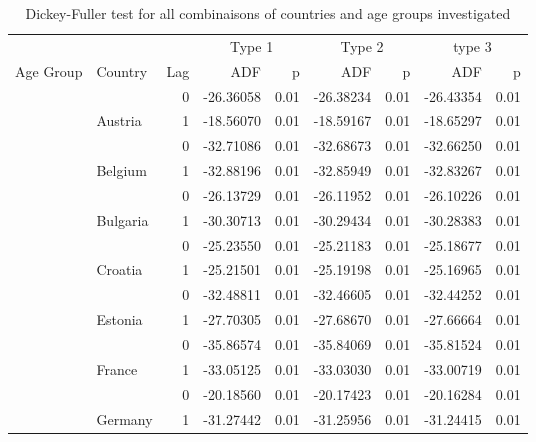 \documentclass[
]{article}
\begin{document}
\begin{table}
\centering
\caption{\label{tab:unnamed-chunk-6}Dickey-Fuller test for all combinaisons of countries and age groups investigated}
\centering
\begin{tabular}[t]{l|l|r|r|r|r|r|r|r}
\hline
\multicolumn{3}{c|}{ } & \multicolumn{2}{c|}{Type 1} & \multicolumn{2}{c|}{Type 2} & \multicolumn{2}{c}{type 3} \\
\cline{4-5} \cline{6-7} \cline{8-9}
Age Group & Country & Lag & ADF & p & ADF & p & ADF & p\\
\hline
 &  & 0 & -26.36058 & 0.01 & -26.38234 & 0.01 & -26.43354 & 0.01\\
\cline{3-9}
 & \multirow{-2}{*}{\raggedright\arraybackslash Austria} & 1 & -18.56070 & 0.01 & -18.59167 & 0.01 & -18.65297 & 0.01\\
\cline{2-9}
 &  & 0 & -32.71086 & 0.01 & -32.68673 & 0.01 & -32.66250 & 0.01\\
\cline{3-9}
 & \multirow{-2}{*}{\raggedright\arraybackslash Belgium} & 1 & -32.88196 & 0.01 & -32.85949 & 0.01 & -32.83267 & 0.01\\
\cline{2-9}
 &  & 0 & -26.13729 & 0.01 & -26.11952 & 0.01 & -26.10226 & 0.01\\
\cline{3-9}
 & \multirow{-2}{*}{\raggedright\arraybackslash Bulgaria} & 1 & -30.30713 & 0.01 & -30.29434 & 0.01 & -30.28383 & 0.01\\
\cline{2-9}
 &  & 0 & -25.23550 & 0.01 & -25.21183 & 0.01 & -25.18677 & 0.01\\
\cline{3-9}
 & \multirow{-2}{*}{\raggedright\arraybackslash Croatia} & 1 & -25.21501 & 0.01 & -25.19198 & 0.01 & -25.16965 & 0.01\\
\cline{2-9}
 &  & 0 & -32.48811 & 0.01 & -32.46605 & 0.01 & -32.44252 & 0.01\\
\cline{3-9}
 & \multirow{-2}{*}{\raggedright\arraybackslash Estonia} & 1 & -27.70305 & 0.01 & -27.68670 & 0.01 & -27.66664 & 0.01\\
\cline{2-9}
 &  & 0 & -35.86574 & 0.01 & -35.84069 & 0.01 & -35.81524 & 0.01\\
\cline{3-9}
 & \multirow{-2}{*}{\raggedright\arraybackslash France} & 1 & -33.05125 & 0.01 & -33.03030 & 0.01 & -33.00719 & 0.01\\
\cline{2-9}
 &  & 0 & -20.18560 & 0.01 & -20.17423 & 0.01 & -20.16284 & 0.01\\
\cline{3-9}
 & \multirow{-2}{*}{\raggedright\arraybackslash Germany} & 1 & -31.27442 & 0.01 & -31.25956 & 0.01 & -31.24415 & 0.01\\

\end{tabular}
\end{table}
\end{document}
